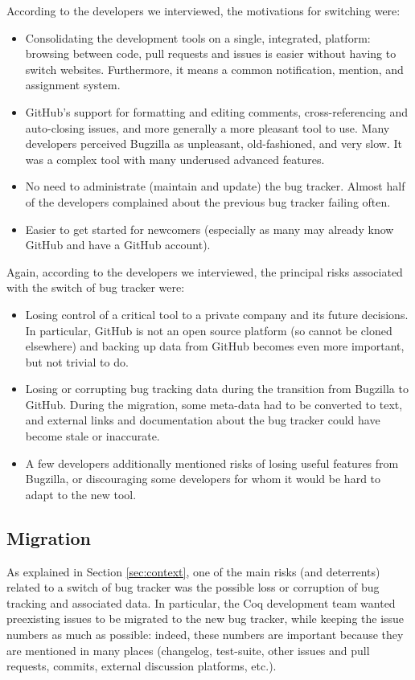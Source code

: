 According to the developers we interviewed, the motivations for switching were:
\begin{itemize}
	\item Consolidating the development tools on a single, integrated, platform: browsing between code, pull requests and issues is easier without having to switch websites. Furthermore, it means a common notification, mention, and assignment system.
	\item GitHub's support for formatting and editing comments, cross-referencing and auto-closing issues, and more generally a more pleasant tool to use. Many developers perceived Bugzilla as unpleasant, old-fashioned, and very slow. It was a complex tool with many underused advanced features.
	\item No need to administrate (maintain and update) the bug tracker. Almost half of the developers complained about the previous bug tracker failing often.
	\item Easier to get started for newcomers (especially as many may already know GitHub and have a GitHub account).
\end{itemize}

Again, according to the developers we interviewed, the principal risks associated with the switch of bug tracker were:
\begin{itemize}
	\item Losing control of a critical tool to a private company and its future decisions. In particular, GitHub is not an open source platform (so cannot be cloned elsewhere) and backing up data from GitHub becomes even more important, but not trivial to do.
	\item Losing or corrupting bug tracking data during the transition from Bugzilla to GitHub.
	During the migration, some meta-data had to be converted to text, and external links and documentation about the bug tracker could have become stale or inaccurate.
	\item A few developers additionally mentioned risks of losing useful features from Bugzilla, or discouraging some developers for whom it would be hard to adapt to the new tool.
\end{itemize}

\subsection{Migration}

\label{sec:migration}

As explained in Section \ref{sec:context}, one of the main risks (and deterrents) related to a switch of bug tracker was the possible loss or corruption of bug tracking and associated data. In particular, the Coq development team wanted preexisting issues to be migrated to the new bug tracker, while keeping the issue numbers as much as possible: indeed, these numbers are important because they are mentioned in many places (changelog, test-suite, other issues and pull requests, commits, external discussion platforms, etc.).

